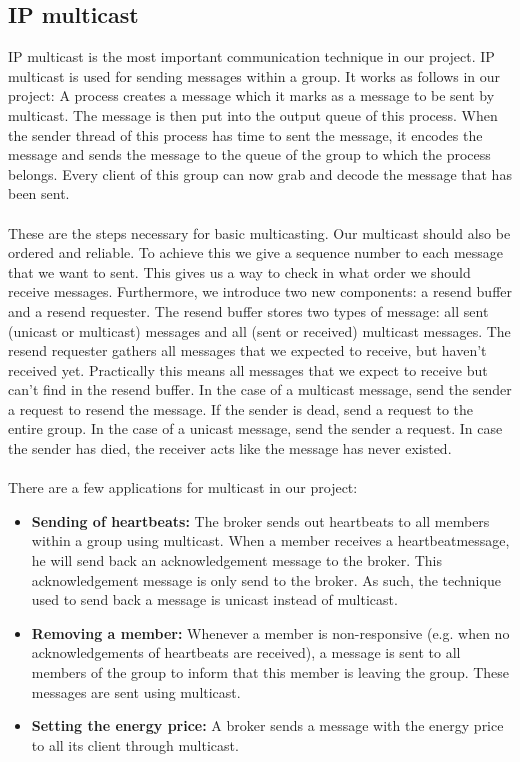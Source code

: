 \documentclass[10pt]{article} %
\begin{document}
\subsection{IP multicast}
IP multicast is the most important communication technique in our project. IP multicast is used for sending messages within a group. It works as follows in our project: A process creates a message which it marks as a message to be sent by multicast. The message is then put into the output queue of this process. When the sender thread of this process has time to sent the message, it encodes the message and sends the message to the queue of the group to which the process belongs. Every client of this group can now grab and decode the message that has been sent.\\
\\
These are the steps necessary for basic multicasting. Our multicast should also be ordered and reliable. To achieve this we give a sequence number to each message that we want to sent. This gives us a way to check in what order we should receive messages. Furthermore, we introduce two new components: a resend buffer and a resend requester. The resend buffer stores two types of message: all sent (unicast or multicast) messages and all (sent or received) multicast messages. The resend requester gathers all messages that we expected to receive, but haven't received yet. Practically this means all messages that we expect to receive but can't find in the resend buffer. In the case of a multicast message, send the sender a request to resend the message. If the sender is dead, send a request to the entire group. In the case of a unicast message, send the sender a request. In case the sender has died, the receiver acts like the message has never existed.\\
\\
There are a few applications for multicast in our project:
\begin{itemize}
 \item \textbf{Sending of heartbeats:} The broker sends out heartbeats to all members within a group using multicast. When a member receives a heartbeatmessage, he will send back an acknowledgement message to the broker. This acknowledgement message is only send to the broker. As such, the technique used  to send back a message is unicast instead of multicast.\\
 \item \textbf{Removing a member:} Whenever a member is non-responsive (e.g. when no acknowledgements of heartbeats are received), a message is sent to all members of the group to inform that this member is leaving the group. These messages are sent using multicast.\\
 \item \textbf{Setting the energy price:} A broker sends a message with the energy price to all its client through multicast.\\
\end{itemize}
\end{document}
